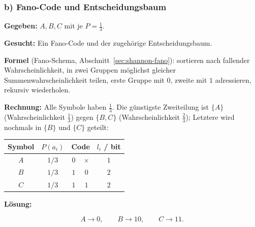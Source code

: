 \subsubsection*{b) Fano-Code und Entscheidungsbaum}

\begin{beispiel}

\textbf{Gegeben:} $A,B,C$ mit je $P = \tfrac{1}{3}$.

\textbf{Gesucht:} Ein Fano-Code und der zugehörige Entscheidungsbaum.

\textbf{Formel} (Fano-Schema, Abschnitt~\ref{sec:shannon-fano}): sortieren nach
fallender Wahrscheinlichkeit, in zwei Gruppen möglichst gleicher
Summenwahrscheinlichkeit teilen, erste Gruppe mit $0$, zweite mit $1$
adressieren, rekursiv wiederholen.

\textbf{Rechnung:} Alle Symbole haben $\tfrac13$. Die günstigste Zweiteilung ist
$\{A\}$ (Wahrscheinlichkeit $\tfrac13$) gegen $\{B,C\}$ (Wahrscheinlichkeit
$\tfrac23$); Letztere wird nochmals in $\{B\}$ und $\{C\}$ geteilt:

\begin{center}
\begin{tabular}{c|c|cc|c}
Symbol & $P(a_i)$ & \multicolumn{2}{c|}{Code} & $l_i$ / bit \\
\hline
$A$ & $1/3$ & $0$ & $\times$ & $1$ \\
$B$ & $1/3$ & $1$ & $0$ & $2$ \\
$C$ & $1/3$ & $1$ & $1$ & $2$ \\
\end{tabular}
\end{center}

\textbf{Lösung:}

$$
\boxed{\;A \rightarrow 0, \qquad B \rightarrow 10, \qquad C \rightarrow 11.\;}
$$

\begin{center}
\end{center}

\end{beispiel}

